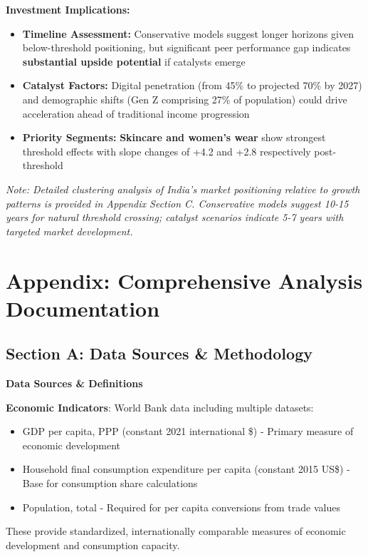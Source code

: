 \documentclass[11pt]{article}
\begin{document}
\textbf{Investment Implications:}
\vspace{-5pt}
\begin{itemize}
    \setlength{\itemsep}{-2pt}
    \item \textbf{Timeline Assessment:} Conservative models suggest longer horizons given below-threshold positioning, but significant peer performance gap indicates \textbf{substantial upside potential} if catalysts emerge
    
    \item \textbf{Catalyst Factors:} Digital penetration (from 45\% to projected 70\% by 2027) and demographic shifts (Gen Z comprising 27\% of population) could drive acceleration ahead of traditional income progression
    
    \item \textbf{Priority Segments:} \textbf{Skincare and women's wear} show strongest threshold effects with slope changes of +4.2 and +2.8 respectively post-threshold
\end{itemize} 

\textit{Note: Detailed clustering analysis of India's market positioning relative to growth patterns is provided in Appendix Section C. Conservative models suggest 10-15 years for natural threshold crossing; catalyst scenarios indicate 5-7 years with targeted market development.}

\newpage

\section*{Appendix: Comprehensive Analysis Documentation}

\subsection*{Section A: Data Sources \& Methodology}

\textbf{Data Sources \& Definitions}

\textbf{Economic Indicators}: World Bank data including multiple datasets:
\begin{itemize}
    \item GDP per capita, PPP (constant 2021 international \$) - Primary measure of economic development
    \item Household final consumption expenditure per capita (constant 2015 US\$) - Base for consumption share calculations  
    \item Population, total - Required for per capita conversions from trade values
\end{itemize}
These provide standardized, internationally comparable measures of economic development and consumption capacity.
\end{document}
